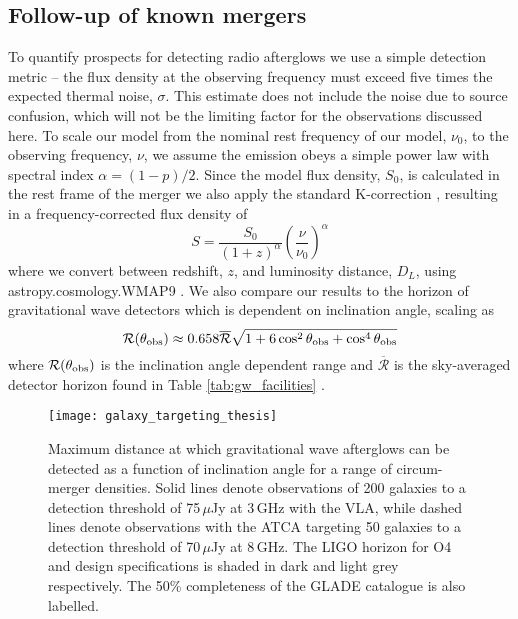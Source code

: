 \subsection{Follow-up of known mergers}
\label{subsec:follow_up_detectability}
To quantify prospects for detecting radio afterglows we use a simple detection metric -- the flux density at the observing frequency must exceed five times the expected thermal noise, $\sigma$. This estimate does not include the noise due to source confusion, which will not be the limiting factor for the observations discussed here. To scale our model from the nominal rest frequency of our model, $\nu_0$, to the observing frequency, $\nu$, we assume the emission obeys a simple power law with spectral index $\alpha=(1-p)/2$. Since the model flux density, $S_0$, is calculated in the rest frame of the merger we also apply the standard K-correction \citep[see e.g.][]{2017A&A...602A...5N}, resulting in a frequency-corrected flux density of
\begin{equation}
    S = \frac{S_0}{(1+z)^\alpha} \left(\frac{\nu}{\nu_0}\right)^{\alpha}
\end{equation}
where we convert between redshift, $z$, and luminosity distance, $D_L$, using {\sc astropy.cosmology.WMAP9} \citep{2013ApJS..208...19H}. We also compare our results to the horizon of gravitational wave detectors which is dependent on inclination angle, scaling as 
\begin{equation}
    \mathcal{R}(\theta_{\rm obs}) \approx 0.658\overline{\mathcal{R}}\sqrt{1+6\cos^2\theta_{\rm obs}+\cos^4\theta_{\rm obs}}
    \label{eq:gw_inc_angle_chap6}
\end{equation}
where $\mathcal{R}(\theta_{\rm obs})$ is the inclination angle dependent range and $\overline{\mathcal{R}}$ is the sky-averaged detector horizon found in Table \ref{tab:gw_facilities} \citep{1993PhRvD..47.2198F}.




\begin{figure}
    \centering
    \texttt{[image: galaxy\_targeting\_thesis]}
    \caption[Detection horizon for galaxy-targeteing searches]{Maximum distance at which gravitational wave afterglows can be detected as a function of inclination angle for a range of circum-merger densities. Solid lines denote observations of 200 galaxies to a detection threshold of 75\,$\mu$Jy at 3\,GHz with the VLA, while dashed lines denote observations with the ATCA targeting 50 galaxies to a detection threshold of 70\,$\mu$Jy at 8\,GHz. The LIGO horizon for O4 and design specifications is shaded in dark and light grey respectively. The 50\% completeness of the GLADE catalogue is also labelled.}
    \label{fig:galaxy_targeting_range}
\end{figure}

